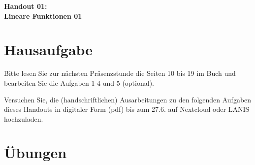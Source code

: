 \documentclass[a4paper,ngerman,12pt]{exam}
\begin{document}
\vspace*{0.3cm}
\begin{center}
	\huge\bfseries Handout 01:\\ Lineare Funktionen 01
\end{center}

\section*{Hausaufgabe}

\par Bitte lesen Sie zur nächsten Präsenzstunde die Seiten 10 bis 19 im Buch und bearbeiten Sie die Aufgaben 1-4 und 5 (optional).

\par Versuchen Sie, die (handschriftlichen) Ausarbeitungen zu den folgenden Aufgaben dieses Handouts in digitaler Form (pdf) bis zum 27.6. auf Nextcloud oder LANIS hochzuladen.

\section*{Übungen}
\end{document}
